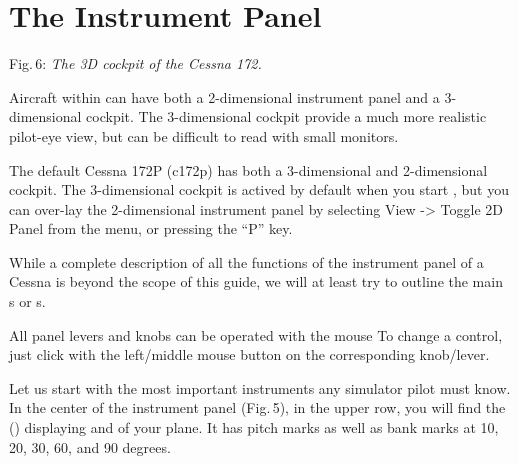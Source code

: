 \section{The Instrument Panel}

 \centerline{}

\smallskip
 \noindent
Fig.\,6: \textit{The 3D cockpit of the Cessna 172.}
\medskip

Aircraft within \FlightGear{} can have both a 2-dimensional instrument panel
and a 3-dimensional cockpit. The 3-dimensional cockpit provide a much
more realistic pilot-eye view, but can be difficult to read with small 
monitors.

The default Cessna 172P (c172p) has both a 3-dimensional and 2-dimensional
cockpit. The 3-dimensional cockpit is actived by default when you start 
\FlightGear{}, but you can over-lay the 2-dimensional instrument panel by 
selecting View -> Toggle 2D Panel from the menu, or pressing the ``P'' key.  

While a complete description of all the functions of the instrument panel 
of a Cessna is beyond the scope of this guide, we will at least try to outline 
the main s or s.

All panel levers and knobs can be operated with the mouse To change a
control, just click with the left/middle mouse button on the
corresponding knob/lever.

Let us start with the most important instruments any simulator pilot must know.
In the
center of the instrument panel (Fig.\,5), in the upper row, you will find the
 () displaying 
and
 of your plane. It has pitch marks as well as bank marks at 10, 20,
30, 60,
and 90 degrees.

